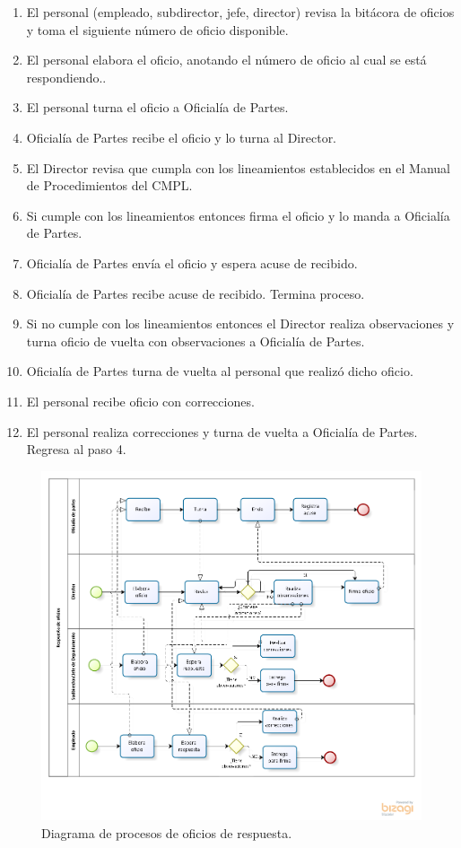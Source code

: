	\begin{enumerate}
		\item El personal (empleado, subdirector, jefe, director) revisa la bitácora de oficios y toma el siguiente número de oficio disponible.
		\item El personal elabora el oficio, anotando el número de oficio al cual se está respondiendo..
		\item El personal turna el oficio a Oficialía de Partes.
		\item Oficialía de Partes recibe el oficio y lo turna al Director.
		\item El Director revisa que cumpla con los lineamientos establecidos en el Manual de Procedimientos del CMPL.
		\item Si cumple con los lineamientos entonces firma el oficio y lo manda a Oficialía de Partes.
		\item Oficialía de Partes envía el oficio y espera acuse de recibido.
		\item Oficialía de Partes recibe acuse de recibido. Termina proceso.
		\item Si no cumple con los lineamientos entonces el Director realiza observaciones y turna oficio de vuelta con observaciones a Oficialía de Partes.
		\item Oficialía de Partes turna de vuelta al personal que realizó dicho oficio.
		\item El personal recibe oficio con correcciones.
		\item El personal realiza correcciones y turna de vuelta a Oficialía de Partes. Regresa al paso 4.
	\end{enumerate}	
	
	\begin{figure}[htbp!]
		\centering
			\includegraphics[width=1.2\textwidth]{images/antecedentes/respondeoficio.png}
		\caption{Diagrama de procesos de oficios de respuesta.}
		\label{fig:OficiosRespuesta}
	\end{figure}
	
